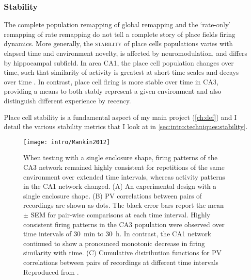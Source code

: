 \subsubsection{Stability}
The complete population remapping of global remapping and the `rate-only' remapping of rate remapping do not tell a complete story of place fields firing dynamics.
More generally, the \textsc{stability} of place cells populations varies with elapsed time and environment novelty, is affected by neuromodulation, and differs by hippocampal subfield.
In area CA1, the place cell population changes over time, such that similarity of activity is greatest at short time scales and decays over time \citep{Mankin2012}.
In contrast, place cell firing is more stable over time in CA3, providing a means to both stably represent a given environment and also distinguish different experience by recency.

Place cell stability is a fundamental aspect of my main project (\autoref{ch:def}) and I detail the various stability metrics that I look at in \autoref{sec:intro:techniques:stability}.

\begin{figure}
	\centering
	\texttt{[image: intro/Mankin2012]}
	\caption[Place cell population stability over days]{
		When testing with a single enclosure shape, firing patterns of the CA3 network remained highly consistent for repetitions of the same environment over extended time intervals, whereas activity patterns in the CA1 network changed.
		(A) An experimental design with a single enclosure shape.
		(B) PV correlations between pairs of recordings are shown as dots. The black error bars report the mean $\pm$ SEM for pair-wise comparisons at each time interval.
		Highly consistent firing patterns in the CA3 population were observed over time intervals of 30~min to 30~h. In contrast, the CA1 network continued to show a pronounced monotonic decrease in firing similarity with time.
		(C) Cumulative distribution functions for PV correlations between pairs of recordings at different time intervals
	Reproduced from \citet{Mankin2012}.}
	\label{fig:intro:memory:time_stability}
\end{figure}

\citep{Thompson1990}